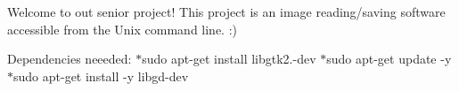 Welcome to out senior project! This project is an image reading/saving software accessible from the Unix command line. \+:)

Dependencies neeeded\+: $\ast$sudo apt-\/get install libgtk2.-\/dev $\ast$sudo apt-\/get update -\/y $\ast$sudo apt-\/get install -\/y libgd-\/dev 
